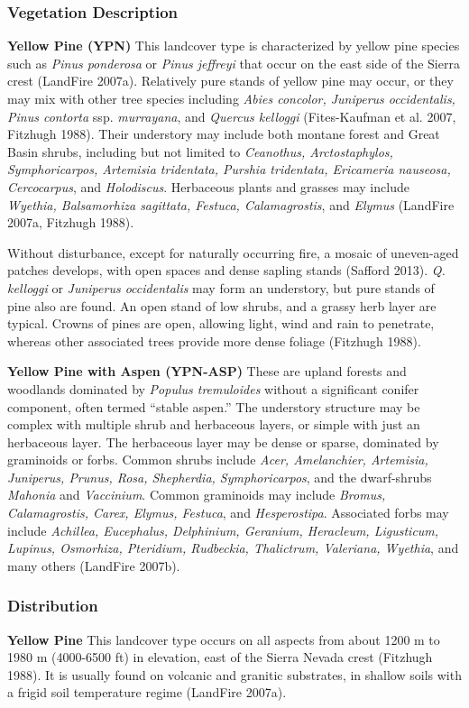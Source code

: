 \subsubsection*{Vegetation Description}
\textbf{Yellow Pine (YPN)}	This landcover type is characterized by yellow pine species such as \emph{Pinus ponderosa} or \emph{Pinus jeffreyi} that occur on the east side of the Sierra crest (LandFire 2007a). Relatively pure stands of yellow pine may occur, or they may mix with other tree species including \emph{Abies concolor, Juniperus occidentalis, Pinus contorta} ssp. \emph{murrayana}, and \emph{Quercus kelloggi} (Fites-Kaufman et al. 2007, Fitzhugh 1988). Their understory may include both montane forest and Great Basin shrubs, including but not limited to \emph{Ceanothus, Arctostaphylos, Symphoricarpos, Artemisia tridentata, Purshia tridentata, Ericameria nauseosa, Cercocarpus}, and \emph{Holodiscus}. Herbaceous plants and grasses may include \emph{Wyethia, Balsamorhiza sagittata, Festuca, Calamagrostis}, and \emph{Elymus} (LandFire 2007a, Fitzhugh 1988).

Without disturbance, except for naturally occurring fire, a mosaic of uneven-aged patches develops, with open spaces and dense sapling stands (Safford 2013). \emph{Q. kelloggi} or \emph{Juniperus occidentalis} may form an understory, but pure stands of pine also are found. An open stand of low shrubs, and a grassy herb layer are typical. Crowns of pines are open, allowing light, wind and rain to penetrate, whereas other associated trees provide more dense foliage (Fitzhugh 1988).

\textbf{Yellow Pine with Aspen (YPN-ASP)} These are upland forests and woodlands dominated by \emph{Populus tremuloides} without a significant conifer component, often termed ``stable aspen.'' The understory structure may be complex with multiple shrub and herbaceous layers, or simple with just an herbaceous layer. The herbaceous layer may be dense or sparse, dominated by graminoids or forbs. Common shrubs include \emph{Acer, Amelanchier, Artemisia, Juniperus, Prunus, Rosa, Shepherdia, Symphoricarpos}, and the dwarf-shrubs \emph{Mahonia} and \emph{Vaccinium}. Common graminoids may include \emph{Bromus, Calamagrostis, Carex, Elymus, Festuca}, and \emph{Hesperostipa}. Associated forbs may include \emph{Achillea, Eucephalus, Delphinium, Geranium, Heracleum, Ligusticum, Lupinus, Osmorhiza, Pteridium, Rudbeckia, Thalictrum, Valeriana, Wyethia}, and many others (LandFire 2007b).


\subsubsection*{Distribution}
\textbf{Yellow Pine}	This landcover type occurs on all aspects from about 1200 m to 1980 m (4000-6500 ft) in elevation, east of the Sierra Nevada crest (Fitzhugh 1988). It is usually found on volcanic and granitic substrates, in shallow soils with a frigid soil temperature regime (LandFire 2007a).

